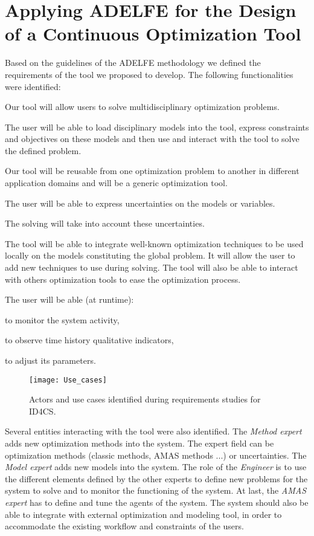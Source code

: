 \section{Applying ADELFE for the Design of a Continuous Optimization Tool}

Based on the guidelines of the ADELFE methodology we defined the requirements of the tool we proposed to develop. The following functionalities were identified:
\begin{compactitem}
\item Our tool will allow users to solve multidisciplinary optimization problems.
\item The user will be able to load disciplinary models into the tool, express constraints and objectives on these models and then use and interact with the tool to solve the defined problem.
\item Our tool will be reusable from one optimization problem to another in different application domains and will be a generic optimization tool.
\item The user will be able to express uncertainties on the models or variables.
\item The solving will take into account these uncertainties.
\item The tool will be able to integrate well-known optimization techniques to be used locally on the models constituting the global problem. It will allow the user to add new techniques to use during solving. The tool will also be able to interact with others optimization tools to ease the optimization process.

\item The user will be able (at runtime):
	\begin{compactitem}
	\item to monitor the system activity,
	\item to observe time history qualitative indicators,
	\item to adjust its parameters.
	\end{compactitem}
\end{compactitem}

\begin{figure}
\centering
\texttt{[image: Use\_cases]}
\caption{Actors and use cases identified during requirements studies for ID4CS.}\label{Use_cases}
\end{figure}

Several entities interacting with the tool were also identified. The \emph{Method expert} adds new optimization methods into the system. The expert field can be optimization methods (classic methods, AMAS methods ...) or uncertainties. The \emph{Model expert} adds new models into the system. The role of the \emph{Engineer} is to use the different elements defined by the other experts to define new problems for the system to solve and to monitor the functioning of the system. At last, the \emph{AMAS expert} has to define and tune the agents of the system. The system should also be able to integrate with external optimization and modeling tool, in order to accommodate the existing workflow and constraints of the users.

